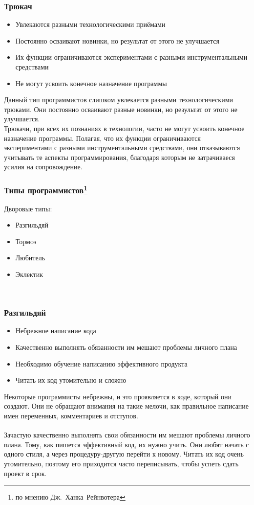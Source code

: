\documentclass{../industrial-development}
\begin{document}
{\begin{frame} \frametitle{Трюкач}
	\begin{itemize}
		\item Увлекаются разными технологическими приёмами
		\item Постоянно осваивают новинки, но результат от этого не улучшается
		\item Их функции ограничиваются экспериментами с разными инструментальными средствами
		\item Не могут усвоить конечное назначение программы
	\end{itemize}
\end{frame}
\lecturenotes
Данный тип программистов слишком увлекается разными технологическими трюками. Они постоянно осваивают разные новинки, но результат от этого не улучшается. \\ 
	Трюкачи, при всех их познаниях в технологии, часто не могут усвоить конечное назначение программы. Полагая, что их функции ограничиваются экспериментами с разными инструментальными средствами, они отказываются учитывать те аспекты программирования, благодаря которым не затрачиваеся усилия на сопровождение. 

\begin{frame} \frametitle{Типы программистов\footnote[1]{по мнению Дж.~Ханка~Рейнвотера}}
	\begin{block}{Дворовые типы:}
\begin{itemize}
\item Разгильдяй
\item Тормоз
\item Любитель
\item Эклектик
\end{itemize}
\end{block}
\end{frame}
\lecturenotes
~\cite{How_to_be_a_good_IT-manager}

\begin{frame} \frametitle{Разгильдяй}
	\begin{itemize}
		\item Небрежное написание кода
		\item Качественно выполнять обязанности им мешают проблемы личного плана
		\item Необходимо обучение написанию эффективного продукта
		\item Читать их код утомительно и сложно
	\end{itemize}	 
\end{frame}
\lecturenotes
Некоторые программисты небрежны, и это проявляется в коде, который они создают. Они не обращают внимания на такие мелочи, как правильное написание имен переменных, комментариев и отступов. \\~\\
Зачастую качественно выполнять свои обязанности им мешают проблемы личного плана. Тому, как пишется эффективный код, их нужно учить. Они любят начать с одного стиля, а через процедуру-другую перейти к новому. Читать их код очень утомительно, поэтому его приходится часто переписывать, чтобы успеть сдать проект в срок. \\

}
\end{document}
